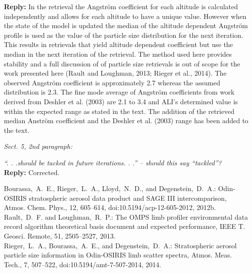 \documentclass[12pt, notitlepage]{article}
\begin{document}
\textbf{Reply:} In the retrieval the Angstr\"{o}m coefficient for each altitude is calculated independently and allows for each altitude to have a unique value. However when the state of the model is updated the median of the altitude dependent Angstr\"{o}m profile is used as the value of the particle size distribution for the next iteration. This results in retrievals that yield altitude dependent coefficient but use the median in the next iteration of the retrieval. The method used here provides stability and a full discussion of of particle size retrievals is out of scope for the work presented here (Rault and Loughman, 2013; Rieger et al., 2014). The observed Angstr\"{o}m coefficient is approximately 2.7 whereas the assumed distribution is 2.3. The fine mode average of Angstr\"{o}m coefficients from work derived from Deshler et al. (2003) are 2.1 to 3.4 and ALI's determined value is within the expected range as stated in the text. The addition of the retrieved median Anstr\"{o}m coefficient and the Deshler et al. (2003) range has been added to the text.

\hrulefill

\textit{Sect. 5, 2nd paragraph:}

\textit{``. . .should be tacked in future iterations. . .'' – should this say ``tackled''?}\\

\textbf{Reply:} Corrected.

\hrulefill

Bourassa,~A.~E., Rieger,~L.~A., Lloyd,~N.~D., and Degenstein,~D.~A.:
Odin-OSIRIS stratospheric aerosol data product and SAGE III intercomparison,
Atmos. Chem. Phys., 12, 605--614,
doi:10.5194/acp-12-605-2012,
2012b.\\

Rault,~D.~F. and Loughman,~R.~P.: The OMPS limb profiler environmental data
record algorithm theoretical basis document and expected performance, IEEE T.
Geosci. Remote, 51, 2505--2527, 2013.\\

Rieger,~L.~A., Bourassa,~A.~E., and Degenstein,~D.~A.: Stratospheric aerosol
particle size information in Odin-OSIRIS limb scatter spectra, Atmos. Meas.
Tech., 7, 507--522,
doi:10.5194/amt-7-507-2014,
2014.\\
\end{document}
